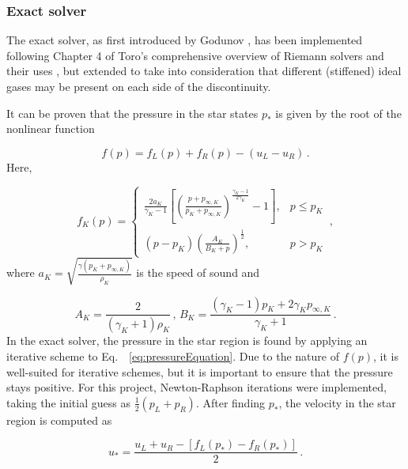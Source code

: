 \documentclass[final,3p,twocolumn]{elsarticle}
\begin{document}
\subsubsection{Exact solver}
\label{subsubsec:exact}

The exact solver, as first introduced by Godunov \cite{godunov1959difference},
has been implemented following Chapter 4 of Toro's comprehensive overview of
Riemann solvers and their uses \cite{toro2013riemann}, but extended to take
into consideration that different (stiffened) ideal gases may be present on
each side of the discontinuity. 

It can be proven that the pressure in the star states $p_{*}$ is given by
the root of the nonlinear function

\begin{equation}
    f(p) = f_L(p)+f_R(p)- (u_L-u_R) \,.
    \label{eq:pressureEquation}
\end{equation}
%
Here,  

\begin{equation*}
    f_K(p) = 
    \begin{cases}
        \frac{2a_K}{\gamma_K-1} \left[ \left(
            \frac{p+p_{\infty,K}}{p_K+p_{\infty,K}}
        \right)^{\frac{\gamma_K-1}{2\gamma_K}}-1\right], &p\leq p_K \\
        (p-p_K)\left( \frac{A_K}{B_K+p} \right)^{\frac{1}{2}}, &p>p_K
    \end{cases} \,,
\end{equation*}
%
where $a_K = \sqrt{\frac{\gamma(p_K+p_{\infty,K})}{\rho_K}}$ is the speed of
sound and 

\begin{equation*}
    A_K = \frac{2}{(\gamma_K+1)\rho_K} \,,\,
    B_K = \frac{(\gamma_K-1)p_K+2\gamma_K p_{\infty, K}}{\gamma_K+1} \,.
\end{equation*}
% 
In the exact solver, the pressure in the star region is found by applying an
iterative scheme to Eq.~ \eqref{eq:pressureEquation}. Due to the nature of
$f(p)$, it is well-suited for iterative schemes, but
it is important to ensure that the pressure stays positive. For this project,
Newton-Raphson iterations were implemented, taking the initial guess as
$\frac{1}{2}(p_L+p_R)$. After finding $p_*$, the velocity in the star region is computed as

\begin{equation}
    u_{*} = \frac{u_L+u_R-[f_L(p_*)-f_R(p_*)]}{2} \,.
    \label{eq:ustar}
\end{equation}
\end{document}
